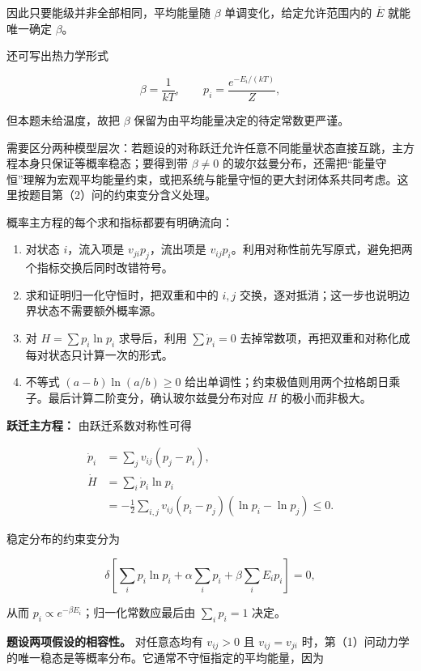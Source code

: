 \documentclass[12pt,a4paper,UTF8]{ctexart}
\newcommand{\tightlist}{\setlength{\itemsep}{0pt}\setlength{\parskip}{0pt}}
\begin{document}
因此只要能级并非全部相同，平均能量随 \(\beta\)
单调变化，给定允许范围内的 \(\overline E\) 就能唯一确定 \(\beta\)。

还可写出热力学形式

\[\beta=\frac1{kT},\qquad
p_i=\frac{e^{-E_i/(kT)}}{Z},\]

但本题未给温度，故把 \(\beta\) 保留为由平均能量决定的待定常数更严谨。

需要区分两种模型层次：若题设的对称跃迁允许任意不同能量状态直接互跳，主方程本身只保证等概率稳态；要得到带
\(\beta\neq0\)
的玻尔兹曼分布，还需把``能量守恒''理解为宏观平均能量约束，或把系统与能量守恒的更大封闭体系共同考虑。这里按题目第（2）问的约束变分含义处理。

概率主方程的每个求和指标都要有明确流向：

\begin{enumerate}
\def\labelenumi{\arabic{enumi}.}
\tightlist
\item
  对状态 \(i\)，流入项是 \(v_{ji}p_j\)，流出项是
  \(v_{ij}p_i\)。利用对称性前先写原式，避免把两个指标交换后同时改错符号。
\item
  求和证明归一化守恒时，把双重和中的 \(i,j\)
  交换，逐对抵消；这一步也说明边界状态不需要额外概率源。
\item
  对 \(H=\sum p_i\ln p_i\) 求导后，利用 \(\sum\dot p_i=0\)
  去掉常数项，再把双重和对称化成每对状态只计算一次的形式。
\item
  不等式 \((a-b)\ln(a/b)\ge0\)
  给出单调性；约束极值则用两个拉格朗日乘子。最后计算二阶变分，确认玻尔兹曼分布对应
  \(H\) 的极小而非极大。
\end{enumerate}

\textbf{跃迁主方程：} 由跃迁系数对称性可得

\[\begin{aligned}
\dot p_i&=\sum_jv_{ij}(p_j-p_i),\\
\dot H&=\sum_i\dot p_i\ln p_i\\
&=-\frac12\sum_{i,j}v_{ij}
(p_i-p_j)(\ln p_i-\ln p_j)\le0.
\end{aligned}\]

稳定分布的约束变分为

\[\delta\!\left[\sum_ip_i\ln p_i
+\alpha\sum_ip_i+\beta\sum_iE_ip_i\right]=0,\]

从而 \(p_i\propto e^{-\beta E_i}\)；归一化常数应最后由 \(\sum_ip_i=1\)
决定。

\textbf{题设两项假设的相容性。} 对任意态均有 \(v_{ij}>0\) 且
\(v_{ij}=v_{ji}\)
时，第（1）问动力学的唯一稳态是等概率分布。它通常不守恒指定的平均能量，因为
\end{document}

